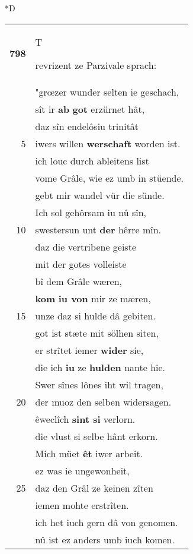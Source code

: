 \documentclass[8pt,a4paper,notitlepage]{article}
\begin{document}
\begin{table}[ht]
\begin{minipage}[t]{0.5\linewidth}
\small
\begin{center}*D
\end{center}
\begin{tabular}{rl}
\textbf{798} & \begin{large}T\end{large}revrizent ze Parzivale sprach:\\ 
 & "grœzer wunder selten ie geschach,\\ 
 & sît ir \textbf{ab} \textbf{got} erzürnet hât,\\ 
 & daz sîn endelôsiu trinitât\\ 
5 & iwers willen \textbf{werschaft} worden ist.\\ 
 & ich louc durch ableitens list\\ 
 & vome Grâle, wie ez umb in stüende.\\ 
 & gebt mir wandel vür die sünde.\\ 
 & Ich sol gehôrsam iu nû sîn,\\ 
10 & swestersun unt \textbf{der} hêrre mîn.\\ 
 & daz die vertribene geiste\\ 
 & mit der gotes volleiste\\ 
 & bî dem Grâle wæren,\\ 
 & \textbf{kom} \textbf{iu von} mir ze mæren,\\ 
15 & unze daz si hulde dâ gebiten.\\ 
 & got ist stæte mit sölhen siten,\\ 
 & er strîtet iemer \textbf{wider} sie,\\ 
 & die ich \textbf{iu} ze \textbf{hulden} nante hie.\\ 
 & Swer sînes lônes iht wil tragen,\\ 
20 & der muoz den selben widersagen.\\ 
 & êweclîch \textbf{sint si} verlorn.\\ 
 & die vlust si selbe hânt erkorn.\\ 
 & Mich müet \textbf{êt} iwer arbeit.\\ 
 & ez was ie ungewonheit,\\ 
25 & daz den Grâl ze keinen zîten\\ 
 & iemen mohte erstrîten.\\ 
 & ich het iuch gern dâ von genomen.\\ 
 & nû ist ez anders umb iuch komen.\\ 

\end{tabular}
\end{minipage}
\end{table}
\end{document}
